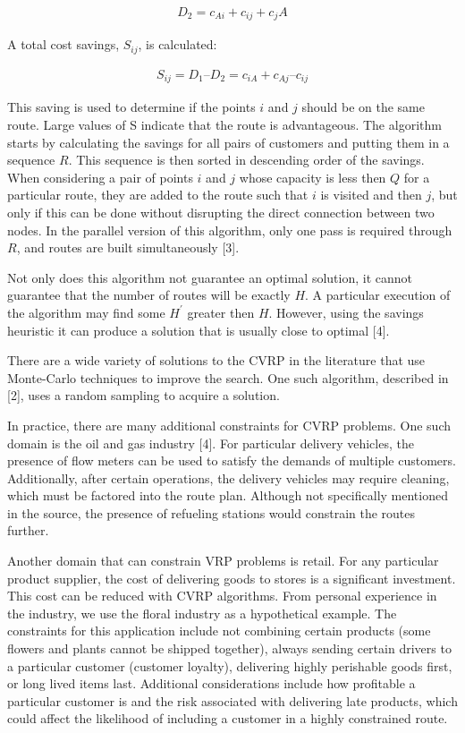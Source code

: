 \documentclass[12pt]{article}
\begin{document}
\begin{align*}
D_2 = c_{Ai} + c_{ij} + c_jA
\end{align*}

A total cost savings, $S_{ij}$, is calculated:

\begin{align*}
S_{ij} = D_1 – D_2 = c_{iA} + c_{Aj} – c_{ij}
\end{align*}

This saving is used to determine if the points $i$ and $j$ should be on the same route. Large values of S indicate that the route is advantageous. 
The algorithm starts by calculating the savings for all pairs of customers and putting them in a sequence $R$. This sequence is then sorted in descending order of the savings. When considering a pair of points $i$ and $j$ whose capacity is less then $Q$ for a particular route, they are added to the route such that $i$ is visited and then $j$, but only if this can be done without disrupting the direct connection between two nodes. In the parallel version of this algorithm, only one pass is required through $R$, and routes are built simultaneously [3].

Not only does this algorithm not guarantee an optimal solution, it cannot guarantee that the number of routes will be exactly $H$. A particular execution of the algorithm may find some $H^\prime$ greater then $H$. However, using the savings heuristic it can produce a solution that is usually close to optimal [4].

There are a wide variety of solutions to the CVRP in the literature that use Monte-Carlo techniques to improve the search. One such algorithm, described in [2], uses a random sampling to acquire a solution.

In practice, there are many additional constraints for CVRP problems. One such domain is the oil and gas industry [4]. For particular delivery vehicles, the presence of flow meters can be used to satisfy the demands of multiple customers. Additionally, after certain operations, the delivery vehicles may require cleaning, which must be factored into the route plan. Although not specifically mentioned in the source, the presence of refueling stations would constrain the routes further.

Another domain that can constrain VRP problems is retail. For any particular product supplier, the cost of delivering goods to stores is a significant investment. This cost can be reduced with CVRP algorithms. From personal experience in the industry, we use the floral industry as a hypothetical example. The constraints for this application include not combining certain products (some flowers and plants cannot be shipped together), always sending certain drivers to a particular customer (customer loyalty), delivering highly perishable goods first, or long lived items last. Additional considerations include how profitable a particular customer is and the risk associated with delivering late products, which could affect the likelihood of including a customer in a highly constrained route.
\end{document}

